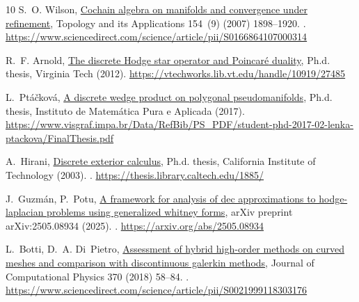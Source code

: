 \documentclass{elsarticle}
\theoremstyle{definition}
\begin{document}
\begin{thebibliography}{10}
S.~O. Wilson,
  \href{https://www.sciencedirect.com/science/article/pii/S0166864107000314}{Cochain
  algebra on manifolds and convergence under refinement}, Topology and its
  Applications 154~(9) (2007) 1898--1920.
\newblock \href {https://doi.org/10.1016/j.topol.2007.01.017}
  {}.
\newline\urlprefix\url{https://www.sciencedirect.com/science/article/pii/S0166864107000314}

R.~F. Arnold, \href{https://vtechworks.lib.vt.edu/handle/10919/27485}{The
  discrete {Hodge} star operator and {Poincar{\'e}} duality}, Ph.d. thesis,
  Virginia Tech (2012).
\newline\urlprefix\url{https://vtechworks.lib.vt.edu/handle/10919/27485}

L.~Pt{\'a}{\v{c}}kov{\'a},
  \href{https://www.visgraf.impa.br/Data/RefBib/PS_PDF/student-phd-2017-02-lenka-ptackova/FinalThesis.pdf}{A
  discrete wedge product on polygonal pseudomanifolds}, Ph.d. thesis, Instituto
  de Matem\'atica Pura e Aplicada (2017).
\newline\urlprefix\url{https://www.visgraf.impa.br/Data/RefBib/PS_PDF/student-phd-2017-02-lenka-ptackova/FinalThesis.pdf}

A.~Hirani, \href{https://thesis.library.caltech.edu/1885/}{Discrete exterior
  calculus}, Ph.d. thesis, California Institute of Technology (2003).
\newblock \href {https://doi.org/10.7907/ZHY8-V329}
  {}.
\newline\urlprefix\url{https://thesis.library.caltech.edu/1885/}

J.~Guzm{\'a}n, P.~Potu, \href{https://arxiv.org/abs/2505.08934}{A framework for
  analysis of dec approximations to hodge-laplacian problems using generalized
  whitney forms}, arXiv preprint arXiv:2505.08934 (2025).
\newblock \href {https://doi.org/10.48550/arXiv.2505.08934}
  {}.
\newline\urlprefix\url{https://arxiv.org/abs/2505.08934}

L.~Botti, D.~A. Di~Pietro,
  \href{https://www.sciencedirect.com/science/article/pii/S0021999118303176}{Assessment
  of hybrid high-order methods on curved meshes and comparison with
  discontinuous galerkin methods}, Journal of Computational Physics 370 (2018)
  58--84.
\newblock \href {https://doi.org/10.1016/j.jcp.2018.05.017}
  {}.
\newline\urlprefix\url{https://www.sciencedirect.com/science/article/pii/S0021999118303176}


\end{thebibliography}
\end{document}
